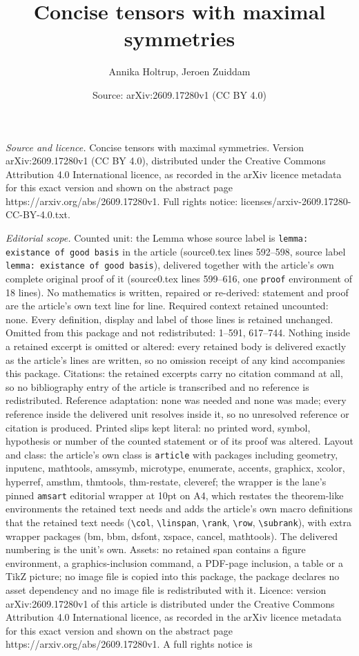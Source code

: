 \documentclass[10pt,a4paper]{amsart}
\title[Concise tensors with maximal symmetries]{Concise tensors with maximal symmetries}
\author{Annika Holtrup, Jeroen Zuiddam}
\date{Source: arXiv:2609.17280v1 (CC BY 4.0)}
\begin{document}
\maketitle

\noindent\emph{Source and licence.} Concise tensors with maximal symmetries. Version arXiv:2609.17280v1 (CC BY 4.0), distributed under the Creative Commons Attribution 4.0 International licence, as recorded in the arXiv licence metadata for this exact version and shown on the abstract page https://arxiv.org/abs/2609.17280v1. Full rights notice: licenses/arxiv-2609.17280-CC-BY-4.0.txt.\par\smallskip

\noindent\textit{Editorial scope.} Counted unit: the Lemma whose source label is \texttt{lemma: existance of good basis} in the article (source0.tex lines 592--598, source label \texttt{lemma: existance of good basis}), delivered together with the article's own complete original proof of it (source0.tex lines 599--616, one \texttt{proof} environment of 18 lines). No mathematics is written, repaired or re-derived: statement and proof are the article's own text line for line. Required context retained uncounted: none. Every definition, display and label of those lines is retained unchanged. Omitted from this package and not redistributed: 1--591, 617--744. Nothing inside a retained excerpt is omitted or altered: every retained body is delivered exactly as the article's lines are written, so no omission receipt of any kind accompanies this package. Citations: the retained excerpts carry no citation command at all, so no bibliography entry of the article is transcribed and no reference is redistributed. Reference adaptation: none was needed and none was made; every reference inside the delivered unit resolves inside it, so no unresolved reference or citation is produced. Printed slips kept literal: no printed word, symbol, hypothesis or number of the counted statement or of its proof was altered. Layout and class: the article's own class is \texttt{article} with packages including geometry, inputenc, mathtools, amssymb, microtype, enumerate, accents, graphicx, xcolor, hyperref, amsthm, thmtools, thm-restate, cleveref; the wrapper is the lane's pinned \texttt{amsart} editorial wrapper at 10pt on A4, which restates the theorem-like environments the retained text needs and adds the article's own macro definitions that the retained text needs (\texttt{\textbackslash col}, \texttt{\textbackslash linspan}, \texttt{\textbackslash rank}, \texttt{\textbackslash row}, \texttt{\textbackslash subrank}), with extra wrapper packages (bm, bbm, dsfont, xspace, cancel, mathtools). The delivered numbering is the unit's own. Assets: no retained span contains a figure environment, a graphics-inclusion command, a PDF-page inclusion, a table or a TikZ picture; no image file is copied into this package, the package declares no asset dependency and no image file is redistributed with it. Licence: version arXiv:2609.17280v1 of this article is distributed under the Creative Commons Attribution 4.0 International licence, as recorded in the arXiv licence metadata for this exact version and shown on the abstract page https://arxiv.org/abs/2609.17280v1. A full rights notice is 
\end{document}
